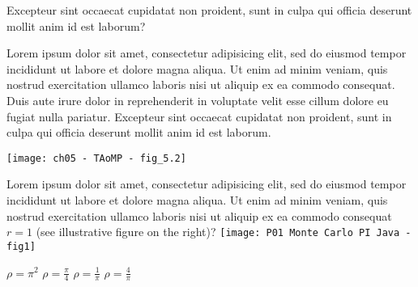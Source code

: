 \question 
{}
Excepteur sint occaecat cupidatat non proident, sunt in culpa qui officia deserunt mollit anim id est laborum?
\begin{splitquestion}{0.5}
\begin{choices}
\choice Lorem ipsum dolor sit amet, consectetur adipisicing elit, sed do eiusmod tempor incididunt ut labore et dolore magna aliqua.
\CHOICE Ut enim ad minim veniam, quis nostrud exercitation ullamco laboris nisi ut aliquip ex ea commodo consequat.
\choice Duis aute irure dolor in reprehenderit in voluptate velit esse cillum dolore eu fugiat nulla pariatur.
\choice Excepteur sint occaecat cupidatat non proident, sunt in culpa qui officia deserunt mollit anim id est laborum.
\end{choices}
\nextpart
\texttt{[image: ch05 - TAoMP - fig\_5.2]}
\end{splitquestion}



\question
\begin{splitquestion}{0.1}
Lorem ipsum dolor sit amet, consectetur adipisicing elit, sed do eiusmod tempor incididunt ut labore et dolore magna aliqua. Ut enim ad minim veniam, quis nostrud exercitation ullamco laboris nisi ut aliquip ex ea commodo consequat \(r = 1\) (see illustrative figure on the right)?
\nextpart
\texttt{[image: P01 Monte Carlo PI Java - fig1]}
\end{splitquestion}
\begin{choices}[4]
\choice \(\rho = \pi^2\)
\CHOICE \(\rho = \frac{\pi}{4}\)
\choice \(\rho = \frac{1}{\pi}\)
\choice \(\rho = \frac{4}{\pi}\)
\end{choices}


